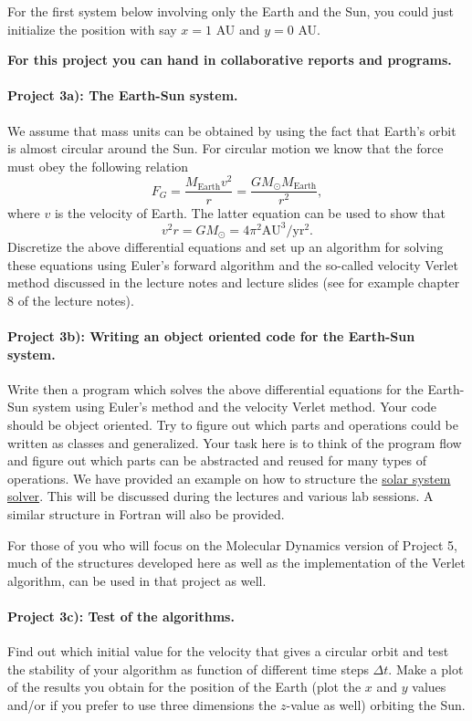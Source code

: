 \documentclass[%
oneside,                 %
final,                   %
10pt]{article}
\begin{document}
For the first system below involving only the Earth and the Sun, you could just initialize the position with say $x=1$ AU
and $y=0$ AU. 

\textbf{For this project you can hand in collaborative reports and programs.}

\paragraph{Project 3a): The Earth-Sun system.}
We assume that mass units can be obtained by using the fact that Earth's orbit is almost circular around the Sun.
For circular motion we know that the force must obey the following relation
\[
F_G= \frac{M_{\mathrm{Earth}}v^2}{r}=\frac{GM_{\odot}M_{\mathrm{Earth}}}{r^2},
\]
where $v$ is the velocity of Earth. 
The latter equation can be used to show that
\[
v^2r=GM_{\odot}=4\pi^2\mathrm{AU}^3/\mathrm{yr}^2.
\]
Discretize the above differential equations and set up an algorithm for solving these equations using Euler's forward algorithm and the so-called velocity Verlet method discussed in the lecture notes and lecture slides (see for example chapter 8 of the lecture notes).

\paragraph{Project 3b): Writing an object oriented code for the Earth-Sun system.}
Write then a program which solves the above differential equations for the Earth-Sun system
using Euler's  method and the velocity Verlet method. 
Your code should be object oriented. Try to figure out which parts and operations could be written as classes
and generalized.  
Your task here is to think of the program flow and figure out which parts can be abstracted and reused for many types of operations. We have provided an example on how to structure
the \href{{https://github.com/CompPhysics/ComputationalPhysics/tree/master/doc/Programs/OOExamples/SolarSystemExample}}{solar system solver}. This will be discussed during the lectures and various lab sessions. A similar structure in Fortran will also be provided. 

For those of you who will focus on the Molecular Dynamics version of Project 5, much of the structures developed here as well as the implementation of the Verlet algorithm, can be used in that project as well.

\paragraph{Project 3c): Test of the algorithms.}
Find out which initial value for the velocity that gives a circular orbit
and test the stability of your algorithm as function of different time steps $\Delta t$. 
Make a plot of the results you obtain for the position of the Earth (plot the $x$ and $y$ values and/or if you prefer to use three dimensions the $z$-value as well) orbiting  the Sun.
\end{document}
